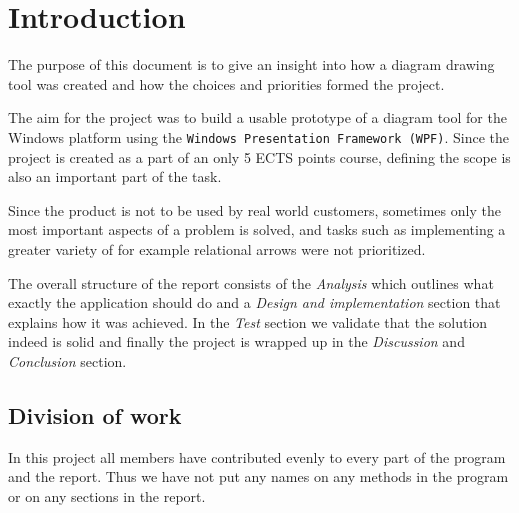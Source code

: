 \section{Introduction}
The purpose of this document is to give an insight into how a diagram drawing
tool was created and how the choices and priorities formed the project. 

The aim for the project was to build a usable prototype of a diagram tool for 
the Windows
platform using the \texttt{Windows Presentation Framework (WPF)}. Since the project is
created as a part of an only 5 ECTS points course, defining the scope is also an
important part of the task.

Since the product is not to be used by real world customers, sometimes only the
most important aspects of a problem is solved, and tasks such as implementing a
greater variety of for
example relational arrows were not prioritized.

The overall structure of the report consists of the
\textit{Analysis} which outlines what exactly the application should do and a
\textit{Design and implementation} section that explains how it was achieved. In the \textit{Test} section
we validate that the solution indeed is solid and finally the project is wrapped
up in the \textit{Discussion} and \textit{Conclusion} section.

\subsection{Division of work}
In this project all members have contributed evenly to every part of the 
program and the report. Thus we have not put any names on any methods in the 
program or on any sections in the report.
